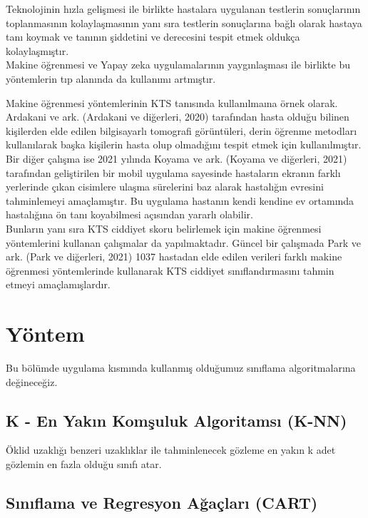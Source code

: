 \documentclass[12pt,twoside]{deuthesis}
\begin{document}
Teknolojinin hızla gelişmesi ile birlikte hastalara uygulanan testlerin sonuçlarının toplanmasının kolaylaşmasının yanı sıra testlerin sonuçlarına bağlı olarak hastaya tanı koymak ve tanının şiddetini ve derecesini tespit etmek oldukça kolaylaşmıştır.\\
Makine öğrenmesi ve Yapay zeka uygulamalarının yaygınlaşması ile birlikte bu yöntemlerin tıp alanında da kullanımı artmıştır.

Makine öğrenmesi yöntemlerinin KTS tanısında kullanılmaına örnek olarak.
Ardakani ve ark. (Ardakani ve diğerleri, 2020) tarafından hasta olduğu bilinen kişilerden elde edilen bilgisayarlı tomografi görüntüleri, derin öğrenme metodları kullanılarak başka kişilerin hasta olup olmadığını tespit etmek için kullanılmıştır.\\
Bir diğer çalışma ise 2021 yılında Koyama ve ark. (Koyama ve diğerleri, 2021) tarafından geliştirilen bir mobil uygulama sayesinde hastaların ekranın farklı yerlerinde çıkan cisimlere ulaşma sürelerini baz alarak hastalığın evresini tahminlemeyi amaçlamıştır. Bu uygulama hastanın kendi kendine ev ortamında hastalığına ön tanı koyabilmesi açısından yararlı olabilir.\\
Bunların yanı sıra KTS ciddiyet skoru belirlemek için makine öğrenmesi yöntemlerini kullanan çalışmalar da yapılmaktadır.
Güncel bir çalışmada Park ve ark. (Park ve diğerleri, 2021) 1037 hastadan elde edilen verileri farklı makine öğrenmesi yöntemlerinde kullanarak KTS ciddiyet sınıflandırmasını tahmin etmeyi amaçlamışlardır.

\hypertarget{yontem}{%
\chapter{Yöntem}\label{yontem}}

Bu bölümde uygulama kısmında kullanmış olduğumuz sınıflama algoritmalarına değineceğiz.

\hypertarget{knn}{%
\section{K - En Yakın Komşuluk Algoritamsı (K-NN)}\label{knn}}

Öklid uzaklığı benzeri uzaklıklar ile tahminlenecek gözleme en yakın k adet gözlemin en fazla olduğu sınıfı atar.

\hypertarget{cart}{%
\section{Sınıflama ve Regresyon Ağaçları (CART)}\label{cart}}
\end{document}
